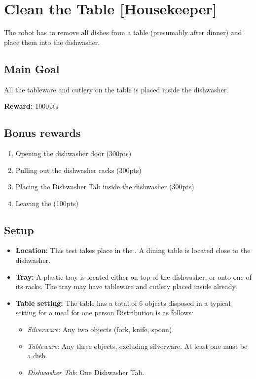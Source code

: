 \section{Clean the Table [Housekeeper]}
\label{test:clean-the-table}
The robot has to remove all dishes from a table (presumably after dinner) and place them into the dishwasher.


\subsection*{Main Goal}
All the tableware and cutlery on the table is placed inside the dishwasher.

\noindent\textbf{Reward:} 1000pts

\subsection*{Bonus rewards}
\begin{enumerate}[nosep]
	\item Opening the dishwasher door (300pts)
	\item Pulling out the dishwasher racks (300pts)
	\item Placing the Dishwasher Tab inside the dishwasher (300pts)
	\item Leaving the \Arena{} (100pts)
\end{enumerate}

\subsection*{Setup}
\begin{itemize}[nosep]
	\item \textbf{Location:} This test takes place in the \Arena{}. A dining table is located close to the dishwasher.
	\item \textbf{Tray:} A plastic tray is located either on top of the dishwasher, or onto one of its racks. The tray may have tableware and cutlery placed inside already.
	\item \textbf{Table setting:} The table has a total of 6 objects disposed in a typical setting for a meal for one person
	Distribution is as follows:
	\begin{itemize}[nosep]
		\item\textit{Silverware}: Any two objects (fork, knife, spoon).
		\item\textit{Tableware}: Any three objects, excluding silverware. At least one must be a dish.
		\item\textit{Dishwasher Tab}: One Dishwasher Tab.
	\end{itemize}
\end{itemize}



